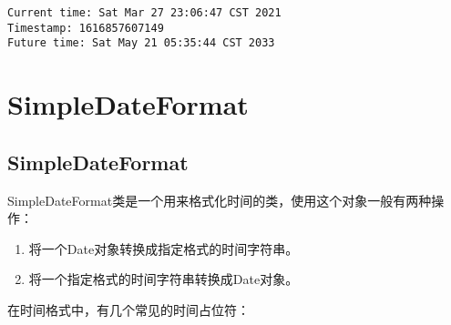 \begin{tcolorbox}
	\begin{verbatim}
Current time: Sat Mar 27 23:06:47 CST 2021
Timestamp: 1616857607149
Future time: Sat May 21 05:35:44 CST 2033
	\end{verbatim}
\end{tcolorbox}

\newpage

\section{SimpleDateFormat}

\subsection{SimpleDateFormat}

SimpleDateFormat类是一个用来格式化时间的类，使用这个对象一般有两种操作：

\begin{enumerate}
	\item 将一个Date对象转换成指定格式的时间字符串。
	\item 将一个指定格式的时间字符串转换成Date对象。
\end{enumerate}

在时间格式中，有几个常见的时间占位符：

\begin{table}[H]
	\centering
	\caption{SimpleDateFormat占位符}
\end{table}

